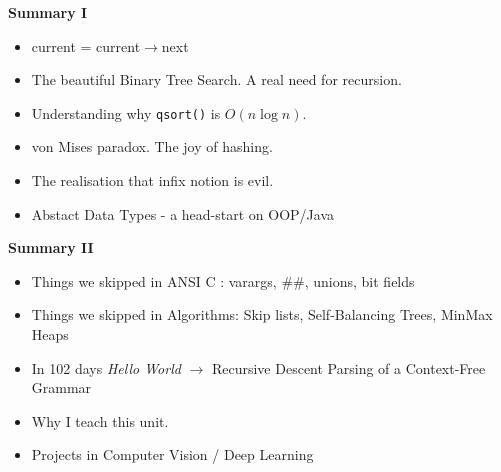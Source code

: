 \newpage
{\samepage
\begin{center}
{\Large{\bf Summary I}}
\end{center}

\begin{itemize}
   \item current = current$\rightarrow$next
   \item The beautiful Binary Tree Search. A real
   need for recursion.
   \item Understanding why {\tt qsort()} is $O(n \log n)$.
   \item von Mises paradox. The joy of hashing.
   \item The realisation that infix notion is evil.
   \item Abstact Data Types - a head-start on OOP/Java
\end{itemize}
}

\newpage
{\samepage
\begin{center}
{\Large{\bf Summary II}}
\end{center}
\begin{itemize}
   \item Things we skipped in ANSI C : varargs, $\#\#$, unions, bit fields
   \item Things we skipped in Algorithms: Skip lists, Self-Balancing Trees, MinMax Heaps
   \item In 102 days {\it Hello World} $\rightarrow$ Recursive Descent Parsing of a Context-Free Grammar
   \item Why I teach this unit.
   \item Projects in Computer Vision / Deep Learning
\end{itemize}
}
